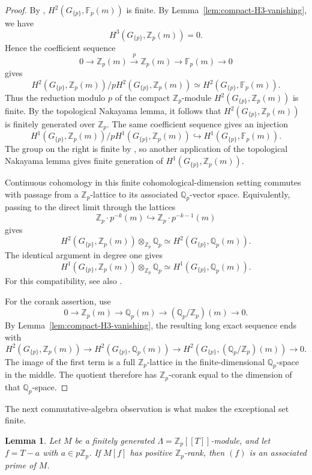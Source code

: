\documentclass[11pt]{amsart}
\numberwithin{equation}{section}
\newcommand{\Fp}{\mathbb F_p}
\newcommand{\Qp}{\mathbb Q_p}
\newcommand{\Zp}{\mathbb Z_p}
\newtheorem{lemma}[theorem]{Lemma}
\theoremstyle{definition}
\begin{document}
\begin{proof}
By \cite[Theorem~8.3.19]{NSW},
$H^2(G_{\{p\}},\Fp(m))$ is finite. By
Lemma~\ref{lem:compact-H3-vanishing}, we have
\[
        H^3(G_{\{p\}},\Zp(m))=0.
\]
Hence the coefficient sequence
\[
0\longrightarrow \Zp(m)
\xrightarrow{p}
\Zp(m)
\longrightarrow
\Fp(m)
\longrightarrow 0
\]
gives
\[
H^2(G_{\{p\}},\Zp(m))/pH^2(G_{\{p\}},\Zp(m))
\simeq
H^2(G_{\{p\}},\Fp(m)).
\]
Thus the reduction modulo $p$ of the compact $\Zp$-module
$H^2(G_{\{p\}},\Zp(m))$ is finite. By the topological Nakayama
lemma, it follows that $H^2(G_{\{p\}},\Zp(m))$ is finitely
generated over $\Zp$. The same coefficient sequence gives an injection
\[
H^1(G_{\{p\}},\Zp(m))/pH^1(G_{\{p\}},\Zp(m))
\hookrightarrow
H^1(G_{\{p\}},\Fp(m)).
\]
The group on the right is finite by
\cite[Theorem~8.3.19]{NSW}, so another application of the topological
Nakayama lemma gives finite generation of
$H^1(G_{\{p\}},\Zp(m))$.

Continuous cohomology in this finite cohomological-dimension setting
commutes with passage from a $\Zp$-lattice to its associated
$\Qp$-vector space. Equivalently, passing to the direct limit through
the lattices
\[
 \Zp\cdot p^{-k}(m)\hookrightarrow\Zp\cdot p^{-k-1}(m)
\]
gives
\[
 H^2(G_{\{p\}},\Zp(m))\otimes_{\Zp}\Qp
 \simeq H^2(G_{\{p\}},\Qp(m)).
\]
The identical argument in degree one gives
\[
 H^1(G_{\{p\}},\Zp(m))\otimes_{\Zp}\Qp
 \simeq H^1(G_{\{p\}},\Qp(m)).
\]
For this compatibility, see also \cite[Chapter~2, \S7]{NSW}.

For the corank assertion, use
\[
 0\longrightarrow\Zp(m)
 \longrightarrow\Qp(m)
 \longrightarrow(\Qp/\Zp)(m)
 \longrightarrow0.
\]
By Lemma~\ref{lem:compact-H3-vanishing}, the resulting long exact
sequence ends with
\[
 H^2(G_{\{p\}},\Zp(m))
 \longrightarrow H^2(G_{\{p\}},\Qp(m))
 \longrightarrow H^2(G_{\{p\}},(\Qp/\Zp)(m))
 \longrightarrow0.
\]
The image of the first term is a full $\Zp$-lattice in the
finite-dimensional $\Qp$-space in the middle. The quotient therefore
has $\Zp$-corank equal to the dimension of that $\Qp$-space.
\end{proof}

The next commutative-algebra observation is what makes the exceptional set finite.

\begin{lemma}\label{lem:associated-prime}
Let $M$ be a finitely generated
$\Lambda=\Zp[[T]]$-module, and let $f=T-a$ with $a\in p\Zp$.
If $M[f]$ has positive $\Zp$-rank, then $(f)$ is an associated
prime of $M$.
\end{lemma}
\end{document}
